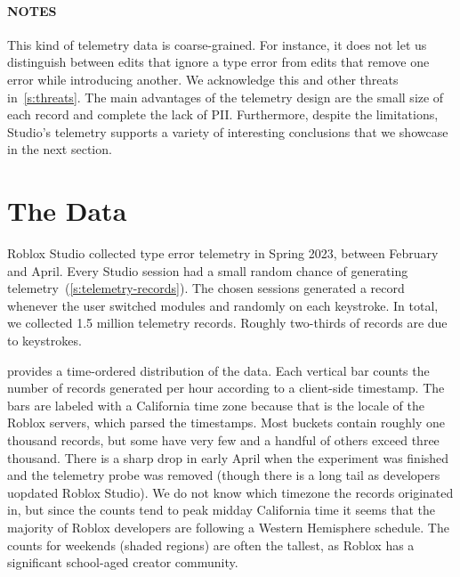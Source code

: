 \documentclass[english,submission,cleveref]{programming}
\begin{document}
\paragraph{NOTES} %
This kind of telemetry data is coarse-grained.
For instance, it does not let us distinguish between edits that ignore a type
error from edits that remove one error while introducing another.
We acknowledge this and other threats in~\cref{s:threats}.
The main advantages of the telemetry design are the small size of each record
and complete the lack of PII.
Furthermore, despite the limitations, Studio's telemetry supports a variety of
interesting conclusions that we showcase in the next section.


\section{The Data}
\label{s:data}

Roblox Studio collected type error telemetry in Spring 2023,
between February and April.
Every Studio session had a small random chance of generating
telemetry~(\cref{s:telemetry-records}).
The chosen sessions generated a record whenever the user switched modules and
randomly on each keystroke.
In total, we collected 1.5 million telemetry records.
Roughly two-thirds of records are due to keystrokes.

 provides a time-ordered distribution of the data.
Each vertical bar counts the number of records generated per hour according to
a client-side timestamp.
The bars are labeled with a California time zone because that is the locale of
the Roblox servers, which parsed the timestamps.
Most buckets contain roughly one thousand records, but some have very few
and a handful of others exceed three thousand.
There is a sharp drop in early April when the experiment was finished
and the telemetry probe was removed (though there is a long tail as
developers uopdated Roblox Studio).
We do not know which timezone the records originated in, but since the counts
tend to peak midday California time it seems that the majority
of Roblox developers are following a Western Hemisphere schedule.
The counts for weekends (shaded regions) are often the tallest,
as Roblox has a significant school-aged creator community.
\end{document}
